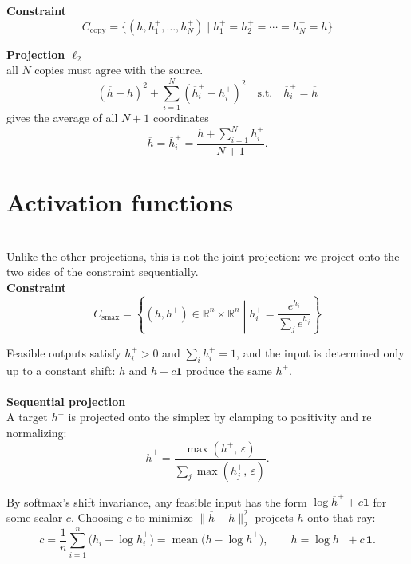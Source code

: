 \begin{tcolorbox}[projectioncard, title=Branch Layer]
 
\textbf{Constraint}
\[
C_{\mathrm{copy}} = \{(h, h^+_1, \dots, h^+_N) \mid h^+_1 = h^+_2 = \cdots = h^+_N = h\}
\]
 
\textbf{Projection $\ell_2$}\\
all $N$ copies must agree with the source. 
\[
(\overline{h}-h)^2 + \sum_{i=1}^{N} (\overline{h}^+_i - h^+_i)^2
\quad\text{s.t.}\quad \overline{h}^+_i = \overline{h}
\]
gives the average of all $N+1$ coordinates
\[
\overline{h} = \overline{h}^+_i = \frac{h + \sum_{i=1}^{N} h^+_i}{N+1}.
\]
\end{tcolorbox}

\section{Activation functions}
 \begin{tcolorbox}[projectioncard, title=Softmax (heuristic)]
\\
Unlike the other projections, this is not the joint projection: we project onto
the two sides of the constraint sequentially.
\\
\textbf{Constraint}
\[
C_{\mathrm{smax}} = \left\{(h, h^+) \in \mathbb{R}^n \times \mathbb{R}^n \middle|
h^+_i = \frac{e^{h_i}}{\sum_{j} e^{h_j}}\right\}
\]

Feasible outputs satisfy $h^+_i > 0$ and $\sum_i h^+_i = 1$, and the input is
determined only up to a constant shift: $h$ and $h + c\mathbf{1}$ produce the
same $h^+$.
\\
\\
\textbf{Sequential projection} \\
A target $h^+$ is projected onto the simplex by clamping to positivity and re normalizing:
\[
\overline{h}^+ = \frac{\max(h^+,\, \varepsilon)}{\sum_{j} \max(h^+_j,\, \varepsilon)}.
\]

 By softmax's shift invariance, any feasible input has the form $\log \overline{h}^+ + c\mathbf{1}$
for some scalar $c$. Choosing $c$ to minimize
$\lVert \overline{h} - h \rVert_2^2$ projects $h$ onto that ray:
\[
c = \frac{1}{n}\sum_{i=1}^{n}\bigl(h_i - \log \overline{h}^+_i\bigr)
  = \operatorname{mean}\!\bigl(h - \log \overline{h}^+\bigr),
\qquad
\overline{h} = \log \overline{h}^+ + c\,\mathbf{1}.
\]
\end{tcolorbox}
\newpage
